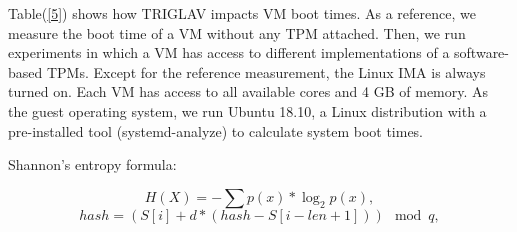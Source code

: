 \documentclass[acmtog]{acmart}
\begin{document}
\raggedright Table(\ref{5}) shows how TRIGLAV impacts VM boot times. As a reference, we measure the boot time of a VM without any TPM attached. Then, we run experiments in which a VM has access to different implementations of a software-based TPMs. Except for the reference measurement, the Linux IMA is always turned on. Each VM has access to all available cores and 4 GB of memory. As the guest operating system, we run Ubuntu 18.10, a Linux distribution with a pre-installed tool (systemd-analyze) to calculate system boot times.
\raggedright Shannon's entropy formula:

\[H(X) = -\sum{p(x)} * \log_2{p(x)}, \]
\[hash = \left( S[i] + d * (hash - S[i - len + 1])\right)\mod{q}, \]
\end{document}
